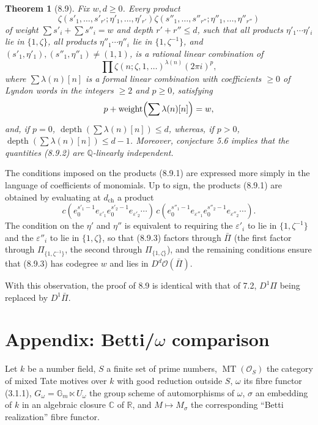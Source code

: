 \documentclass[10pt,a4paper]{article}
\newcommand{\Gm}{\mathbb G_m}
\newcommand{\Q}{\mathbb Q}
\newcommand{\MT}{\operatorname{MT}}
\newcommand{\OO}{\mathcal O}
\newcommand{\C}{\mathbb C}
\newcommand{\R}{\mathbb R}
\theoremstyle{deligne}
\newtheorem*{theorem*}{Theorem}
\newcommand{\heading}[1]{\vspace{0.65em}\noindent{\bfseries #1}\quad}
\begin{document}
\begin{theorem*}[8.9]
Fix \(w,d\ge0\). Every product
\[
\tag{8.9.1}
\zeta(s'_1,\ldots,s'_{r'};\eta'_1,\ldots,\eta'_{r'})
\zeta(s''_1,\ldots,s''_{r''};\eta''_1,\ldots,\eta''_{r''})
\]
of weight \(\sum s'_i+\sum s''_i=w\) and depth \(r'+r''\le d\), such that all products \(\eta'_1\cdots\eta'_i\) lie in \(\{1,\zeta\}\), all products \(\eta''_1\cdots\eta''_i\) lie in \(\{1,\zeta^{-1}\}\), and \((s'_1,\eta'_1),(s''_1,\eta''_1)\ne(1,1)\), is a rational linear combination of
\[
\tag{8.9.2}
\prod\zeta(n;\zeta,1,\ldots)^{\lambda(n)}(2\pi i)^p,
\]
where \(\sum\lambda(n)[n]\) is a formal linear combination with coefficients \(\ge0\) of Lyndon words in the integers \(\ge2\) and \(p\ge0\), satisfying
\[
p+\operatorname{weight}\Bigl(\sum\lambda(n)[n]\Bigr)=w,
\]
and, if \(p=0\), \(\operatorname{depth}(\sum\lambda(n)[n])\le d\), whereas, if \(p>0\), \(\operatorname{depth}(\sum\lambda(n)[n])\le d-1\). Moreover, conjecture 5.6 implies that the quantities (8.9.2) are \(\Q\)-linearly independent.
\end{theorem*}

The conditions imposed on the products (8.9.1) are expressed more simply in the language of coefficients of monomials. Up to sign, the products (8.9.1) are obtained by evaluating at \(d_{\mathrm{ch}}\) a product
\[
\tag{8.9.3}
c(e_0^{s'_1-1}e_{\varepsilon'_1}e_0^{s'_2-1}e_{\varepsilon'_2}\cdots)
\,c(e_0^{s''_1-1}e_{\varepsilon''_1}e_0^{s''_2-1}e_{\varepsilon''_2}\cdots).
\]
The condition on the \(\eta'\) and \(\eta''\) is equivalent to requiring the \(\varepsilon'_i\) to lie in \(\{1,\zeta^{-1}\}\) and the \(\varepsilon''_i\) to lie in \(\{1,\zeta\}\), so that (8.9.3) factors through \(\bar\Pi\) (the first factor through \(\Pi_{\{1,\zeta^{-1}\}}\), the second through \(\Pi_{\{1,\zeta\}}\)), and the remaining conditions ensure that (8.9.3) has codegree \(w\) and lies in \(D^d\OO(\bar\Pi)\).

With this observation, the proof of 8.9 is identical with that of 7.2, \(D^1\Pi\) being replaced by \(D^1\bar\Pi\).

\section*{Appendix: Betti/\(\omega\) comparison}

\heading{A.1.} Let \(k\) be a number field, \(S\) a finite set of prime numbers, \(\MT(\OO_S)\) the category of mixed Tate motives over \(k\) with good reduction outside \(S\), \(\omega\) its fibre functor (3.1.1), \(G_\omega=\Gm\ltimes U_\omega\) the group scheme of automorphisms of \(\omega\), \(\sigma\) an embedding of \(k\) in an algebraic closure \(\C\) of \(\R\), and \(M\mapsto M_\sigma\) the corresponding ``Betti realization'' fibre functor.
\end{document}
